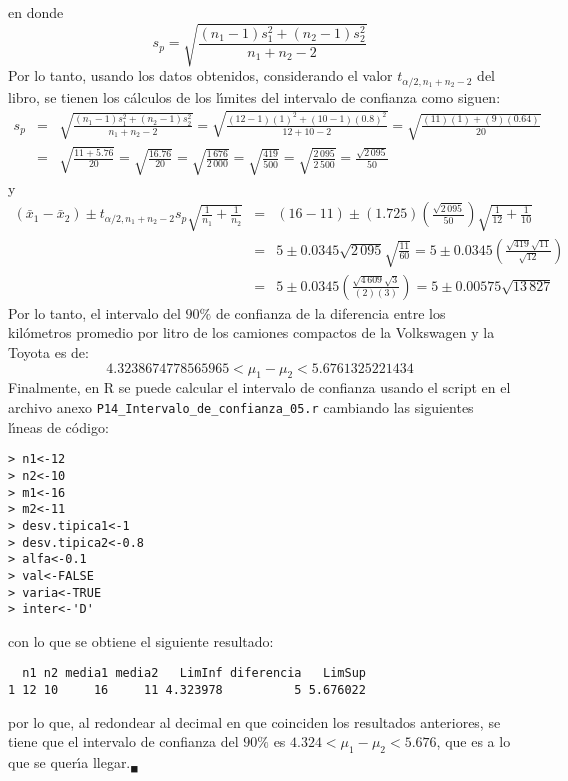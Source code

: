 \begin{solucion}
 en donde
 \begin{equation*}
  s_p = \sqrt{\frac{\left(n_1 - 1 \right)s_1^2 + \left(n_2 - 1\right)s_2^2}{n_1 + n_2 - 2}}
 \end{equation*}
 Por lo tanto, usando los datos obtenidos, considerando el valor $t_{\alpha/2,n_1+n_2-2}$ del libro, se tienen los c\'alculos de los l\'{\i}mites del intervalo de confianza como siguen:
 \begin{eqnarray*}
  s_p & = & \sqrt{\frac{\left(n_1 - 1 \right)s_1^2 + \left(n_2 - 1\right)s_2^2}{n_1 + n_2 - 2}} = \sqrt{\frac{(12-1)(1)^2 + (10-1)(0.8)^2}{12+10-2}} = \sqrt{\frac{(11)(1) + (9)(0.64)}{20}} \\
  & = & \sqrt{\frac{11+5.76}{20}} = \sqrt{\frac{16.76}{20}} = \sqrt{\frac{1\,676}{2\,000}} = \sqrt{\frac{419}{500}} = \sqrt{\frac{2\,095}{2\,500}} = \frac{\sqrt{2\,095}}{50}
 \end{eqnarray*}
 y
 \begin{eqnarray*}
  \left( \bar{x}_1 - \bar{x}_2 \right) \pm t_{\alpha/2,n_1+n_2-2} s_p \sqrt{\frac{1}{n_1} + \frac{1}{n_2}} 
  & = & (16-11) \pm (1.725) \left( \frac{\sqrt{2\,095}}{50} \right) \sqrt{\frac{1}{12} + \frac{1}{10}} \\
  & = & 5 \pm 0.0345 \sqrt{2\,095} \sqrt{\frac{11}{60}} = 5 \pm 0.0345 \left( \frac{\sqrt{419}\sqrt{11}}{\sqrt{12}} \right) \\
  & = & 5 \pm 0.0345 \left( \frac{\sqrt{4\,609}\sqrt{3}}{(2)(3)} \right) = 5 \pm 0.00575 \sqrt{13\,827}
 \end{eqnarray*}
 Por lo tanto, el intervalo del $90\%$ de confianza de la diferencia entre los kil\'ometros promedio por litro de los camiones compactos de la Volkswagen y la Toyota es de:
 \begin{equation*}
  4.3238674778565965 < \mu_1 - \mu_2 < 5.6761325221434
 \end{equation*}
 Finalmente, en R se puede calcular el intervalo de confianza usando el script en el archivo anexo \texttt{P14\_Intervalo\_de\_confianza\_05.r} cambiando las siguientes l\'{\i}neas de c\'odigo:
 \begin{verbatim}
> n1<-12
> n2<-10
> m1<-16
> m2<-11
> desv.tipica1<-1
> desv.tipica2<-0.8
> alfa<-0.1
> val<-FALSE
> varia<-TRUE
> inter<-'D'
 \end{verbatim}
 \vspace{-0.5cm}
 con lo que se obtiene el siguiente resultado:
 \begin{verbatim}
  n1 n2 media1 media2   LimInf diferencia   LimSup
1 12 10     16     11 4.323978          5 5.676022
 \end{verbatim}
 \vspace{-0.5cm}
 por lo que, al redondear al decimal en que coinciden los resultados anteriores, se tiene que el intervalo de confianza del $90\%$ es $4.324 < \mu_1 - \mu_2 < 5.676$, que es a lo que se quer\'{\i}a llegar.${}_{\blacksquare}$
\end{solucion}
